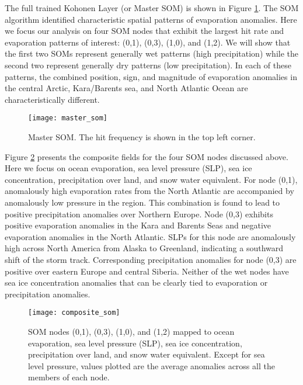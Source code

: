 The full trained Kohonen Layer (or Master SOM) is shown in Figure \ref{fig:master_som}.
The SOM algorithm identified characteristic spatial patterns of evaporation anomalies.
Here we focus our analysis on four SOM nodes that exhibit the largest hit rate and evaporation patterns of interest: (0,1), (0,3), (1,0), and (1,2). %
We will show that the first two SOMs represent generally wet patterns (high precipitation) while the second two represent generally dry patterns (low precipitation). %
In each of these patterns, the combined position, sign, and magnitude of evaporation anomalies in the central Arctic, Kara/Barents sea, and North Atlantic Ocean are characteristically different.

\begin{figure}
  \centering
  \texttt{[image: master\_som]}
  \caption{Master SOM. The hit frequency is shown in the top left corner.}
  \label{fig:master_som}
\end{figure}


Figure \ref{fig:composite_som} presents the composite fields for the four SOM nodes discussed above. %
Here we focus on ocean evaporation, sea level pressure (SLP), sea ice concentration, precipitation over land, and snow water equivalent.
For node (0,1), anomalously high evaporation rates from the North Atlantic are accompanied by anomalously low pressure in the region.
This combination is found to lead to positive precipitation anomalies over Northern Europe.
Node (0,3) exhibits positive evaporation anomalies in the Kara and Barents Seas and negative evaporation anomalies in the North Atlantic.
SLPs for this node are anomalously high across North America from Alaska to Greenland, indicating a southward shift of the storm track.
Corresponding precipitation anomalies for node (0,3) are positive over eastern Europe and central Siberia.
Neither of the wet nodes have sea ice concentration anomalies that can be clearly tied to evaporation or precipitation anomalies.  %

\begin{figure}
  \centering
  \texttt{[image: composite\_som]}
  \caption{SOM nodes (0,1), (0,3), (1,0), and (1,2) mapped to ocean evaporation, sea level pressure (SLP), sea ice concentration, precipitation over land, and snow water equivalent. Except for sea level pressure, values plotted are the average anomalies across all the members of each node.}
  \label{fig:composite_som}
\end{figure}

